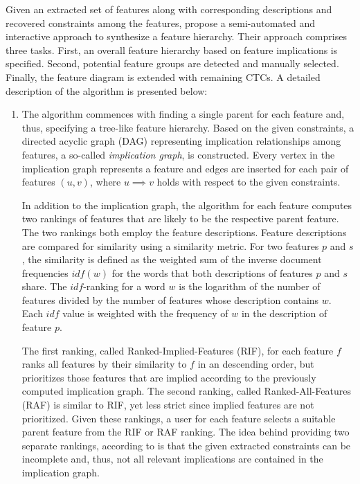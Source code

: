 Given an extracted set of features along with corresponding descriptions and
recovered constraints among the features, \cite{she_reverse_2011} propose a
semi-automated and interactive approach to synthesize a feature hierarchy.
Their approach comprises three tasks. First, an overall feature hierarchy based
on feature implications is specified. Second, potential feature groups are
detected and manually selected. Finally, the feature diagram is extended with
remaining CTCs. A detailed description of the algorithm is presented below:

\begin{enumerate}
  \item The algorithm commences with finding a single parent for each
  feature and, thus, specifying a tree-like feature hierarchy. Based on the
  given constraints, a directed acyclic graph (DAG) representing implication
  relationships among features, a so-called \emph{implication graph}, is
  constructed.
  Every vertex in the implication graph represents a feature  and edges are
  inserted for each pair of features $(u, v)$, where  $u \implies v$ holds with respect to the given
  constraints.
   
  In addition to the implication graph, the algorithm for each feature computes
  two rankings of features that are likely to be the respective parent feature.
  The two rankings both employ the feature descriptions. Feature descriptions
  are compared for similarity using a similarity metric. For two features $p$
  and $s$, the similarity is defined as the weighted sum of the inverse document
  frequencies $idf(w)$ for the words that both descriptions of features $p$
  and $s$ share.
  The $idf$-ranking for a word $w$ is the logarithm of the number of features
  divided by the number of features whose description contains $w$. Each $idf$
  value is weighted with the frequency of $w$ in the description of
  feature $p$.
  
  The first ranking, called Ranked-Implied-Features (RIF), for each feature $f$
  ranks all features by their similarity to $f$ in an descending order, but
  prioritizes those features that are implied according to the previously
  computed implication graph. The second ranking, called Ranked-All-Features
  (RAF) is similar to RIF, yet less strict since implied features are not
  prioritized. Given these rankings, a user for each feature selects a suitable
  parent feature from the RIF or RAF ranking. The idea behind providing two
  separate rankings, according to \cite{she_reverse_2011} is that the given
  extracted constraints can be incomplete and, thus, not all relevant
  implications are contained in the implication graph.


\end{enumerate}
